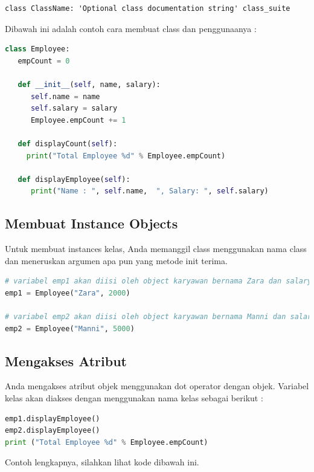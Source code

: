 \begin{lstlisting}
class ClassName: 'Optional class documentation string' class_suite
\end{lstlisting}

Dibawah ini adalah contoh cara membuat class dan penggunaanya :

\begin{lstlisting}[language=Python]
class Employee:
   empCount = 0

   def __init__(self, name, salary):
      self.name = name
      self.salary = salary
      Employee.empCount += 1
   
   def displayCount(self):
     print("Total Employee %d" % Employee.empCount)

   def displayEmployee(self):
      print("Name : ", self.name,  ", Salary: ", self.salary)
\end{lstlisting}

\subsection{Membuat Instance Objects}
Untuk membuat instances kelas, Anda memanggil class menggunakan nama class dan meneruskan argumen apa pun yang metode init terima.
\begin{lstlisting}[language=Python]
# variabel emp1 akan diisi oleh object karyawan bernama Zara dan salary 2000
emp1 = Employee("Zara", 2000)

# variabel emp2 akan diisi oleh object karyawan bernama Manni dan salary 5000
emp2 = Employee("Manni", 5000)
\end{lstlisting}

\subsection{Mengakses Atribut}
Anda mengakses atribut objek menggunakan dot operator dengan objek. Variabel kelas akan diakses dengan menggunakan nama kelas sebagai berikut :
\begin{lstlisting}[language=Python]
emp1.displayEmployee()
emp2.displayEmployee()
print ("Total Employee %d" % Employee.empCount)
\end{lstlisting}

Contoh lengkapnya, silahkan lihat kode dibawah ini.

